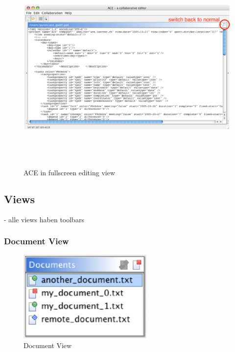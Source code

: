 \documentclass[11pt,a4paper]{article}
\begin{document}
\begin{figure}[H]
\begin{center}
  \includegraphics[height=4.18in, width=6.68in]{../images/usermanual/g_editor_fullscreen.eps}
\caption{ACE in fullscreen editing view}
\label{default}
\end{center}
\end{figure}

\subsection{Views}
- alle views haben toolbars

\subsubsection{Document View}
\begin{figure}[H]
\begin{center}
  \includegraphics[height=1.78in, width=2.61in]{../images/usermanual/dview_overview.eps}
\caption{Document View}
\label{default}
\end{center}
\end{figure}
\end{document}
